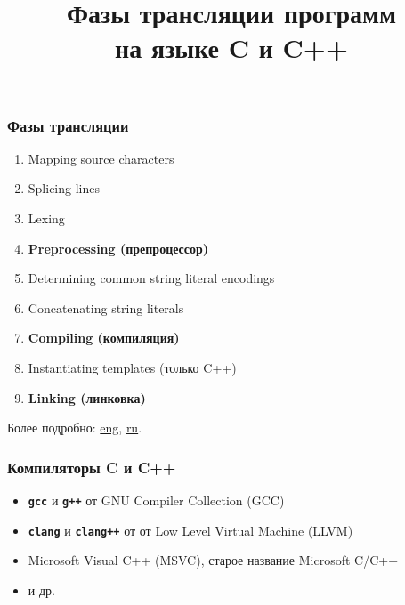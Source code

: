 \documentclass[compress]{beamer}
\title{Фазы трансляции программ \\ на языке C и C++}
\begin{document}
\frame[plain]{\titlepage}

\begin{frame}

    \frametitle{Фазы трансляции}

    \begin{enumerate}

        \item Mapping source characters

        \item Splicing lines

        \item Lexing

        \item \textbf{Preprocessing (препроцессор)}

        \item Determining common string literal encodings

        \item Concatenating string literals

        \item \textbf{Compiling (компиляция)}

        \item Instantiating templates (только C++)

        \item \textbf{Linking (линковка)}

    \end{enumerate}

    \vfill

    Более подробно:
    \href{https://en.cppreference.com/w/cpp/language/translation_phases}{eng},
    \href{https://ru.cppreference.com/w/cpp/language/translation_phases}{ru}.

\end{frame}

\begin{frame}

    \frametitle{Компиляторы C и C++}

    \begin{itemize}

        \item \texttt{\textbf{gcc}} и \texttt{\textbf{g++}} от GNU Compiler Collection (GCC)

        \item \texttt{\textbf{clang}} и \texttt{\textbf{clang++}} от от Low Level Virtual Machine (LLVM)

        \item Microsoft Visual C++ (MSVC), старое название Microsoft C/C++

        \item и др.

    \end{itemize}

\end{frame}
\end{document}
